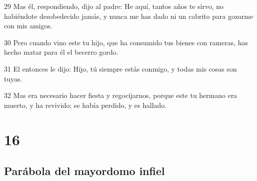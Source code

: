 \par 29 Mas él, respondiendo, dijo al padre: He aquí, tantos años te sirvo, no habiéndote desobedecido jamás, y nunca me has dado ni un cabrito para gozarme con mis amigos.
\par 30 Pero cuando vino este tu hijo, que ha consumido tus bienes con rameras, has hecho matar para él el becerro gordo.
\par 31 El entonces le dijo: Hijo, tú siempre estás conmigo, y todas mis cosas son tuyas.
\par 32 Mas era necesario hacer fiesta y regocijarnos, porque este tu hermano era muerto, y ha revivido; se había perdido, y es hallado.

\chapter{16}

\section*{Parábola del mayordomo infiel}


